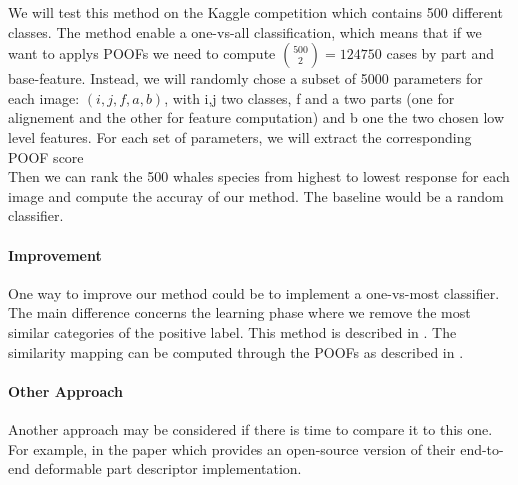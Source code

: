\documentclass[11pt,a4paper,oneside]{report}
\begin{document}
We will test this method on the Kaggle competition which contains 500 different classes. The method enable a one-vs-all classification, which means that if we want to applys POOFs we need to compute $\binom{500}{2} = 124 750$ cases by part and base-feature. Instead, we will randomly chose a subset of 5000 parameters for each image: $(i,j,f,a,b)$, with i,j two classes, f and a two parts (one for alignement and the other for feature computation) and b one the two chosen low level features. For each set of parameters, we will extract the corresponding POOF score\\

Then we can rank the 500 whales species from highest to lowest response for each image and compute the accuray of our method. The baseline would be a random classifier. 

\paragraph{Improvement}

One way to improve our method could be to implement a one-vs-most classifier. The main difference concerns the learning phase where we remove the most similar categories of the positive label. This method is described in \citep{berg-birdsnap-cvpr2014}. The similarity mapping can be computed through the POOFs as described in \citep{berg-blackbird-iccv2013}.

\paragraph{Other Approach}

Another approach may be considered if there is time to compare it to this one. For example, in the paper \cite{Zhang_2013_ICCV} which provides an open-source version of their end-to-end deformable part descriptor implementation.
\end{document}
